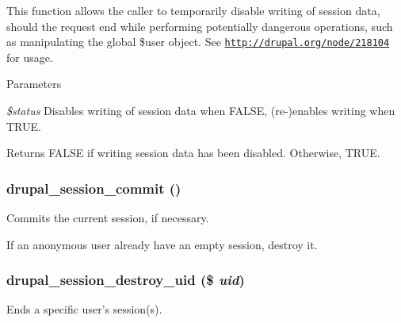 This function allows the caller to temporarily disable writing of session data, should the request end while performing potentially dangerous operations, such as manipulating the global \$user object. See \href{http://drupal.org/node/218104}{\tt http://drupal.org/node/218104} for usage.


\begin{DoxyParams}{Parameters}
\item[{\em \$status}]Disables writing of session data when FALSE, (re-\/)enables writing when TRUE.\end{DoxyParams}
\begin{DoxyReturn}{Returns}
FALSE if writing session data has been disabled. Otherwise, TRUE. 
\end{DoxyReturn}
\hypertarget{session_8inc_ad6c0ee8cae83649ccfbc7f2eef268377}{
\subsubsection[{drupal\_\-session\_\-commit}]{\setlength{\rightskip}{0pt plus 5cm}drupal\_\-session\_\-commit ()}}
\label{session_8inc_ad6c0ee8cae83649ccfbc7f2eef268377}
Commits the current session, if necessary.

If an anonymous user already have an empty session, destroy it. \hypertarget{session_8inc_a5ac41504673ec444e5e2d1aa1dc231f8}{
\subsubsection[{drupal\_\-session\_\-destroy\_\-uid}]{\setlength{\rightskip}{0pt plus 5cm}drupal\_\-session\_\-destroy\_\-uid (\$ {\em uid})}}
\label{session_8inc_a5ac41504673ec444e5e2d1aa1dc231f8}
Ends a specific user's session(s).


